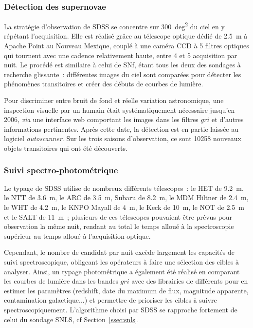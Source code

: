 \documentclass[../main/main.tex]{subfiles}
\begin{document}
\subsubsection{Détection des supernovae}\label{sssec:sdssdetec}

La stratégie d'observation de SDSS se concentre sur \SI{300}{deg^2} du ciel en y
répétant l'acquisition. Elle est réalisé grâce au télescope optique dédié de
\SI{2.5}{m} \citep{gunn2006} à Apache Point au Nouveau Mexique, couplé à une
caméra CCD \citep{gunn1998} à 5 filtres optiques
\citep[$ugriz$,][]{fukugita1996} qui tournent avec une cadence relativement
haute, entre 4 et 5 acquisition par nuit. Le procédé est similaire à celui de
SNf, étant tous les deux des sondages à recherche glissante~: différentes images
du ciel sont comparées pour détecter les phénomènes transitoires et créer des
débuts de courbes de lumière.

Pour discriminer entre bruit de fond et réelle variation astronomique, une
inspection visuelle par un humain était systématiquement nécessaire jusqu'en
2006, \textit{via} une interface web comportant les images dans les filtres
$gri$ et d'autres informations pertinentes. Après cette date, la détection est
en partie laissée au logiciel \textit{autoscanner}. Sur les trois saisons
d'observation, ce sont 10258 nouveaux objets transitoires qui ont été
découverts.

\subsubsection{Suivi spectro-photométrique}\label{sssec:sdssspectro}

Le typage de SDSS utilise de nombreux différents télescopes~: le HET de
\SI{9.2}{m}, le NTT de \SI{3.6}{m}, le ARC de \SI{3.5}{m}, Subaru de
\SI{8.2}{m}, le MDM Hiltner de \SI{2.4}{m}, le WHT de \SI{4.2}{m}, le KNPO
Mayall de \SI{4}{m}, le Keck de \SI{10}{m}, le NOT de \SI{2.5}{m} et le SALT de
\SI{11}{m}~; plusieurs de ces télescopes pouvaient être prévus pour observation
la même nuit, rendant au total le temps alloué à la spectroscopie supérieur au
temps alloué à l'acquisition optique.

Cependant, le nombre de candidat par nuit excède largement les capacités de
suivi spectroscopique, obligeant les opérateurs à faire une sélection des cibles
à analyser. Ainsi, un typage photométrique a également été réalisé en comparant
les courbes de lumière dans les bandes $gri$ avec des librairies de différents
 pour en estimer les paramètres (redshift, date du maximum de flux,
magnitude apparente, contamination galactique...) et permettre de prioriser les
cibles à suivre spectroscopiquement. L'algorithme choisi par SDSS se rapproche
fortement de celui du sondage SNLS, cf Section~\ref{ssec:snls}.
\end{document}
